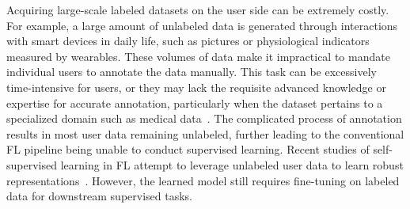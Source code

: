 \documentclass[withindex,glossary,firstyr]{cam-thesis}
\begin{document}
Acquiring large-scale labeled datasets on the user side can be extremely costly. For example, a large amount of unlabeled data is generated through interactions with smart devices in daily life, such as pictures or physiological indicators measured by wearables. These volumes of data make it impractical to mandate individual users to annotate the data manually. This task can be excessively time-intensive for users, or they may lack the requisite advanced knowledge or expertise for accurate annotation, particularly when the dataset pertains to a specialized domain such as medical data~\citep{yang2021federated}. The complicated process of annotation results in most user data remaining unlabeled, further leading to the conventional FL pipeline being unable to conduct supervised learning.
Recent studies of self-supervised learning in FL attempt to leverage unlabeled user data to learn robust representations~\citep{gao2022federated,rehman2022federated,rehman2023dawa}. However, the learned model still requires fine-tuning on labeled data for downstream supervised tasks.

\end{document}
